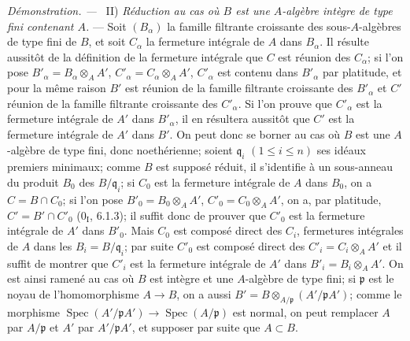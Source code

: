 \documentclass[10pt,oneside]{book}
\newcommand{\oldpage}[2][]{%
  \setcounter{footnote}{0}%
  \marginpar{\scriptsize\textbf{#1}~|~#2}\ignorespaces}
\newenvironment{proof}{%
  \par\medskip\noindent\textit{Démonstration. ---\ }}{\par}
\begin{document}
\begin{proof}
\oldpage[IV-2]{175}
II) \emph{Réduction au cas où $B$ est une $A$-algèbre intègre de type fini
contenant $A$.} --- Soit $(B_\alpha)$ la famille filtrante croissante des
sous-$A$-algèbres de type fini de $B$, et soit $C_\alpha$ la fermeture
intégrale de $A$ dans $B_\alpha$. Il résulte aussitôt de la définition de
la fermeture intégrale que $C$ est réunion des $C_\alpha$; si l'on pose
$B'_\alpha=B_\alpha\otimes_A A'$, $C'_\alpha=C_\alpha\otimes_A A'$,
$C'_\alpha$ est contenu dans $B'_\alpha$ par platitude, et pour la même
raison $B'$ est réunion de la famille filtrante croissante des
$B'_\alpha$ et $C'$ réunion de la famille filtrante croissante des
$C'_\alpha$. Si l'on prouve que $C'_\alpha$ est la fermeture intégrale de
$A'$ dans $B'_\alpha$, il en résultera aussitôt que $C'$ est la fermeture
intégrale de $A'$ dans $B'$. On peut donc se borner au cas où $B$ est une
$A$-algèbre de type fini, donc noethérienne; soient $\mathfrak q_i$
$(1\leqslant i\leqslant n)$ ses idéaux premiers minimaux; comme $B$ est
supposé réduit, il s'identifie à un sous-anneau du produit $B_0$ des
$B/\mathfrak q_i$; si $C_0$ est la fermeture intégrale de $A$ dans $B_0$,
on a $C=B\cap C_0$; si l'on pose $B'_0=B_0\otimes_A A'$,
$C'_0=C_0\otimes_A A'$, on a, par platitude,
$C'=B'\cap C'_0$ (0$_{\mathrm I}$, 6.1.3); il suffit donc de prouver que
$C'_0$ est la fermeture intégrale de $A'$ dans $B'_0$. Mais $C_0$ est
composé direct des $C_i$, fermetures intégrales de $A$ dans les
$B_i=B/\mathfrak q_i$; par suite $C'_0$ est composé direct des
$C'_i=C_i\otimes_A A'$ et il suffit de montrer que $C'_i$ est la fermeture
intégrale de $A'$ dans $B'_i=B_i\otimes_A A'$. On est ainsi ramené au cas
où $B$ est intègre et une $A$-algèbre de type fini; si $\mathfrak p$ est le
noyau de l'homomorphisme $A\to B$, on a aussi
$B'=B\otimes_{A/\mathfrak p}(A'/\mathfrak pA')$; comme le morphisme
$\operatorname{Spec}(A'/\mathfrak pA')\to
\operatorname{Spec}(A/\mathfrak p)$ est normal, on peut remplacer $A$ par
$A/\mathfrak p$ et $A'$ par $A'/\mathfrak pA'$, et supposer par suite que
$A\subset B$.


\end{proof}
\end{document}
